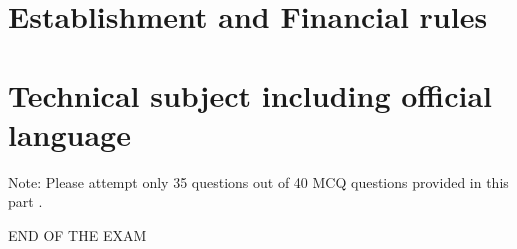 \documentclass[12pt,addpoints]{exam} %
\newcommand{\examdate}{22/12/2021}
\begin{document}
\begin{questions}

\newpage

\section{Establishment and Financial rules}


\section{Technical subject including official language}
Note: Please attempt only 35 questions out of 40 MCQ questions provided in this part .


\vskip 1cm
\hrulefill  \BIG END OF THE EXAM \hrulefill 

\end{questions}




\newpage

\end{document}
